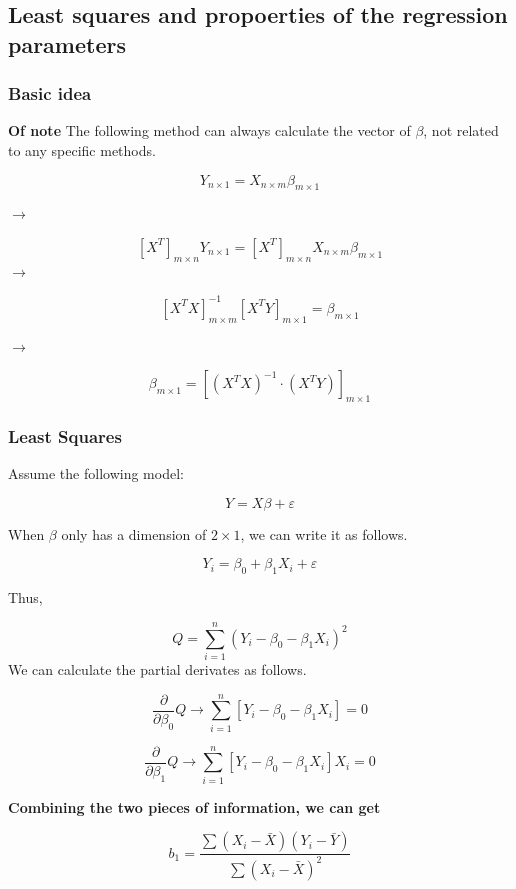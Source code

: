 \documentclass[]{book}
\begin{document}
\hypertarget{least-squares-and-propoerties-of-the-regression-parameters}{%
\subsection{Least squares and propoerties of the regression parameters}\label{least-squares-and-propoerties-of-the-regression-parameters}}

\hypertarget{basic-idea}{%
\subsubsection{Basic idea}\label{basic-idea}}

\textbf{Of note} The following method can always calculate the vector of \(\beta\), not related to any specific methods.

\[Y_{n \times 1}=X_{n\times m}\beta_{m \times 1}\]

\(\rightarrow\)

\[[X^T]_{m \times n}Y_{n \times 1}=[X^T]_{m \times n}X_{n\times m}\beta_{m \times 1}\]
\(\rightarrow\)

\[[X^TX]^{-1}_{m\times m}[X^TY]_{m \times 1}=\beta_{m \times 1}\]

\(\rightarrow\)

\[\beta_{m \times 1}=[(X^TX)^{-1} \cdot (X^TY)]_{m \times 1}\]

\hypertarget{least-squares}{%
\subsubsection{Least Squares}\label{least-squares}}

Assume the following model:

\[Y=X\beta +\varepsilon\]

When \(\beta\) only has a dimension of \(2 \times 1\), we can write it as follows.

\[Y_i=\beta_0+\beta_1X_i +\varepsilon\]

Thus,

\[Q=\sum_{i=1}^n (Y_i-\beta_0-\beta_1X_i)^2\]
We can calculate the partial derivates as follows.

\[\frac{\partial}{\partial \beta_0} Q \rightarrow \sum_{i=1}^n [Y_i-\beta_0-\beta_1X_i]=0\]

\[\frac{\partial}{\partial \beta_1} Q \rightarrow \sum_{i=1}^n [Y_i-\beta_0-\beta_1X_i]X_i=0\]

\textbf{Combining the two pieces of information, we can get}

\[b_1=\frac{\sum(X_i-\bar{X})(Y_i-\bar{Y})}{\sum(X_i-\bar{X})^2}\]
\end{document}
